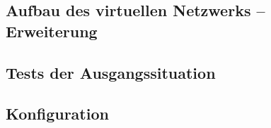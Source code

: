 \subsection{Aufbau des virtuellen Netzwerks – Erweiterung}

\clearpage
\pagebreak
\subsection{Tests der Ausgangssituation}

\clearpage
\pagebreak
\subsection{Konfiguration}

